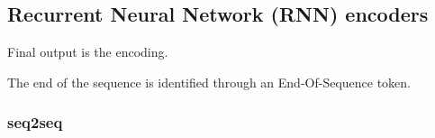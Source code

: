 
\subsection{Recurrent Neural Network (RNN) encoders}

Final output is the encoding.

The end of the sequence is identified through an End-Of-Sequence token.

\subsubsection{seq2seq}


